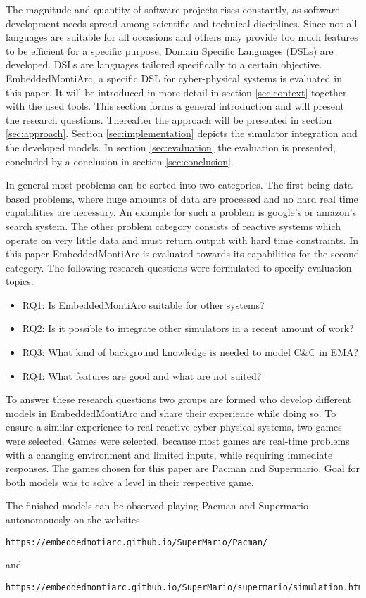 The magnitude and quantity of software projects rises constantly, as software development needs spread among scientific and technical disciplines. Since not all languages are suitable for all occasions and others may provide too much features to be efficient for a specific purpose, Domain Specific Languages (DSLs) are developed. DSLs are languages tailored specifically to a certain objective.
EmbeddedMontiArc, a specific DSL for cyber-physical systems is evaluated in this paper. It will be introduced in more detail in section \ref{sec:context} together with the used tools. This section forms a general introduction and will present the research questions.
Thereafter the approach will be presented in section \ref{sec:approach}. Section \ref{sec:implementation} depicts the simulator integration and the developed models. In section \ref{sec:evaluation} the evaluation is presented, concluded by a conclusion in section \ref{sec:conclusion}.

In general most problems can be sorted into two categories. The first being data based problems, where huge amounts of data are processed and no hard real time capabilities are necessary. An example for such a problem is google's or amazon's search system. The other problem category consists of reactive systems which operate on very little data and must return output with hard time constraints. In this paper EmbeddedMontiArc is evaluated towards its capabilities for the second category.
The following research questions were formulated to specify evaluation topics:

\begin{itemize}
	\item RQ1: Is EmbeddedMontiArc suitable for other systems?
	\item RQ2: Is it possible to integrate other simulators in a recent amount of work?
	\item RQ3: What kind of background knowledge is needed to model C\&C in EMA?
	\item RQ4: What features are good and what are not suited?
\end{itemize}

To answer these research questions two groups are formed who develop different models in EmbeddedMontiArc and share their experience while doing so. To ensure a similar experience to real reactive cyber physical systems, two games were selected.
Games were selected, because most games are real-time problems with a changing environment and limited inputs, while requiring immediate responses.
The games chosen for this paper are Pacman and Supermario. Goal for both models was to solve a level in their respective game.

The finished models can be observed playing Pacman and Supermario autonomouosly on the websites 
\begin{lstlisting}
https://embeddedmotiarc.github.io/SuperMario/Pacman/
\end{lstlisting}
\cite{pacmanmodel}
and
\begin{lstlisting}
https://embeddedmontiarc.github.io/SuperMario/supermario/simulation.html
\end{lstlisting}
\cite{mariomodel}